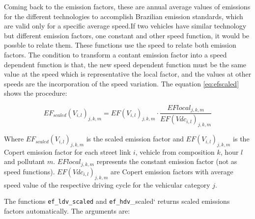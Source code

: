 \documentclass[12pt,graybox,envcountchap,sectrefs]{krantz}
\theoremstyle{definition}
\theoremstyle{definition}
\theoremstyle{definition}
\theoremstyle{remark}
\begin{document}
Coming back to the \citet{CETESB2015} emission factors, these are annual
average values of emissions for the different technologies to accomplish
Brazilian emission standards, which are valid only for a specific
average speed.If two vehicles have similar technology but different
emission factors, one constant and other speed function, it would be
possble to relate them. These functions use the speed to relate both
emission factors. The condition to transform a contant emission factor
into a speed dependent function is that, the new speed dependent
function must be the same value at the speed which is representative the
local factor, and the values at other speeds are the incorporation of
the speed variation. The equation \eqref{eq:efscaled} shows the procedure:

\begin{equation}
EF_{scaled}(V_{i,l})_{j,k,m}=EF(V_{i,l})_{j,k,m} \cdot \frac{EFlocal_{j,k,m}}{{EF(Vdc_{i,l})_{j,k,m}}}
\label{eq:efscaled}
\end{equation}

Where \(EF_{scaled}(V_{i,l})_{j,k,m}\) is the scaled emission factor and
\(EF(V_{i,l})_{j,k,m}\) is the Copert emission factor for each street
link \(i\), vehicle from composition \(k\), hour \(l\) and pollutant
\(m\). \(EFlocal_{j,k,m}\) represents the constant emission factor (not
as speed functions). \(EF(Vdc_{i,l})_{j,k,m}\) are Copert emission
factors with average speed value of the respective driving cycle for the
vehicular category \(j\).

The functions \texttt{ef\_ldv\_scaled} and \texttt{ef\_hdv}\_scaled`
returns scaled emissions factors automatically. The arguments are:
\end{document}
